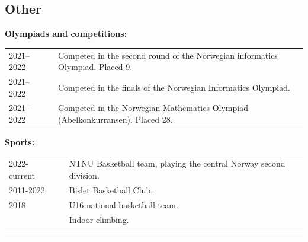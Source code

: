 \documentclass[10pt]{article}
\newlength{\cw}
\newlength{\cwl}
\begin{document}
\newpage

\subsection*{Other}
\textbf{Olympiads and competitions:}

\begin{tabular}{p{\cw} @{:}l p{\cwl}}
  2021--2022 & & Competed in the second round of the Norwegian informatics Olympiad. Placed 9.\\
  2021--2022 & & Competed in the finals of the Norwegian Informatics Olympiad.\\
  2021--2022 & & Competed in the Norwegian Mathematics Olympiad (Abelkonkurransen). Placed 28.\\
\end{tabular}

\textbf{Sports:}

\begin{tabular}{p{\cw} @{:}l p{\cwl}}
  2022-current & & NTNU Basketball team, playing the central Norway second division.\\
  2011-2022 & & Bislet Basketball Club.\\
  2018 & & U16 national basketball team. \\
   & & Indoor climbing. \\
\end{tabular}
\vspace{0.1cm}
\hrule
\vspace{0.1cm}

\end{document}
